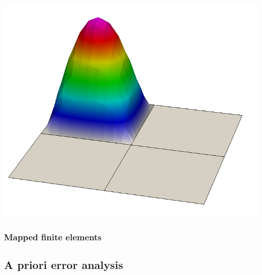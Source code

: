 \documentclass[american,ignorenonframetext,notheorems,aspectratio=1610]{beamer}
\begin{document}
\begin{frame}
\begin{center}
    \includegraphics[height=.27\textheight]{graph/dgbasis1-22}
  \end{center}
\end{frame}

\subsubsection{Mapped finite elements}

\frame {}
\frame {}
\frame {}
\frame {}
\frame {}
\frame {}
\frame {}
\frame {}

\subsection{A priori error analysis}
\frame{\subtoc}

\frame {}
\frame {}
\frame {}
\frame {}
\frame {
  }
\frame {}
\frame {
  }
\frame {}
\end{document}
